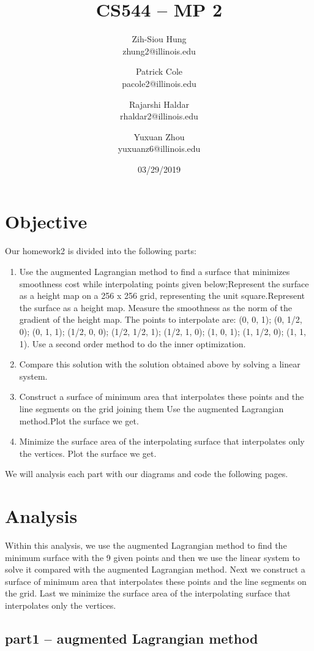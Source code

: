 \documentclass{article}
\title{CS544 -- MP 2}
\author{
	Zih-Siou Hung \\ zhung2@illinois.edu
	\and
	Patrick Cole \\ pacole2@illinois.edu
	\and
	Rajarshi Haldar \\ rhaldar2@illinois.edu
	\and
	Yuxuan Zhou \\ yuxuanz6@illinois.edu
}
\date{03/29/2019}
\begin{document}
\maketitle
\section{Objective}
Our homework2 is divided into the following parts: 
    
\begin{enumerate}
    \item Use the augmented Lagrangian method to find a surface that minimizes smoothness cost while interpolating points given below;Represent the surface as a height map on a 256 x 256 grid, representing the unit square.Represent the surface as a height map. Measure the smoothness as the norm of the gradient of the height map. The points to interpolate are: (0, 0, 1); (0, 1/2, 0); (0, 1, 1); (1/2, 0, 0); (1/2, 1/2, 1); (1/2, 1, 0); (1, 0, 1); (1, 1/2, 0); (1, 1, 1). Use a second order method to do the inner optimization.\label{qncq}
    \item Compare this solution with the solution obtained above by solving a linear system.\label{pr}
    \item Construct a surface of minimum area that interpolates these points and the line segments on the grid joining them  Use the augmented Lagrangian method.Plot the surface we
    get.\label{pr}
    \item Minimize the surface area of the interpolating surface that interpolates only the vertices. Plot the surface we get.\label{pr}
        
\end{enumerate}

We will analysis each part with our diagrams and code the following pages.

\newpage
\section{Analysis}
Within this analysis, we use the augmented Lagrangian method to find the minimum surface with the 9 given points and then we use the linear system to solve it compared with the augmented Lagrangian method. Next we construct a surface of minimum area that interpolates these points and the line segments on the grid. Last we minimize the surface area of the interpolating surface that interpolates only the vertices.
\subsection{part1 -- augmented  Lagrangian  method }
\end{document}

